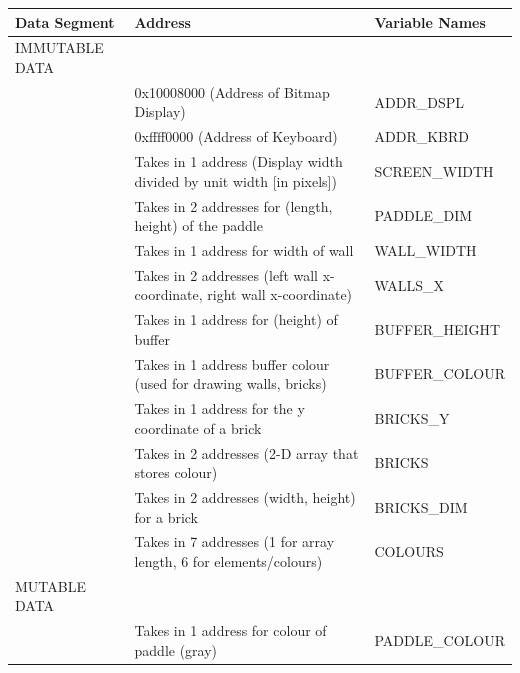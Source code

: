 \documentclass{article}
\begin{document}
\begin{enumerate}
\begin{table}[]
\begin{tabular}{|l|l|l|}
\hline
Data Segment     & Address                                                           & Variable Names           \\ \hline
IMMUTABLE DATA   &                                                                   &                \\ \hline
                 & 0x10008000 (Address of Bitmap Display)                            & ADDR\_DSPL    \\ \hline
                 & 0xffff0000 (Address of Keyboard)                                  & ADDR\_KBRD     \\ \hline
                 & Takes in 1 address (Display width divided by unit width [in pixels])           & SCREEN\_WIDTH  \\ \hline
                 & Takes in 2 addresses for (length, height) of the paddle                                           & PADDLE\_DIM    \\ \hline
                 & Takes in 1 address for width of wall                                           & WALL\_WIDTH    \\ \hline
                 & Takes in 2 addresses (left wall x-coordinate, right wall x-coordinate)                                 & WALLS\_X     \\ \hline
                                  & Takes in 1 address for (height) of buffer                                                           & BUFFER\_HEIGHT \\ \hline
                 & Takes in 1 address buffer colour (used for drawing walls, bricks)              & BUFFER\_COLOUR \\ \hline
                                  & Takes in 1 address for the y coordinate of a brick                & BRICKS\_Y      \\ \hline
                 & Takes in 2 addresses (2-D array that stores colour)               & BRICKS         \\ \hline
                 & Takes in 2 addresses (width, height) for a brick               & BRICKS\_DIM         \\ \hline
                 & Takes in 7 addresses (1 for array length, 6 for elements/colours) & COLOURS        \\ \hline
MUTABLE DATA     &                                                                   &                \\ \hline
                                  & Takes in 1 address for colour of paddle (gray)                                 & PADDLE\_COLOUR \\ \hline

\end{tabular}
\end{table}
\end{enumerate}
\end{document}
